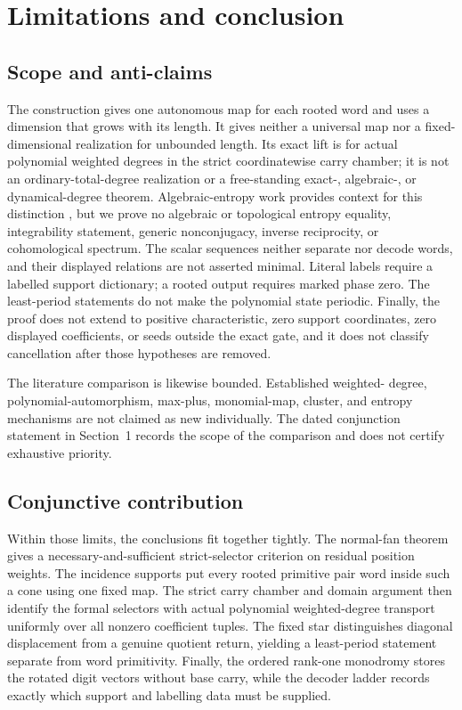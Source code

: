 \documentclass[11pt,letterpaper]{article}
\theoremstyle{definition}
\theoremstyle{remark}
\numberwithin{equation}{section}
\begin{document}
\section{Limitations and conclusion}

\subsection{Scope and anti-claims}

The construction gives one autonomous map for each rooted word and uses a
dimension that grows with its length.  It gives neither a universal map nor
a fixed-dimensional realization for unbounded length.  Its exact lift is
for actual polynomial weighted degrees in the strict coordinatewise carry
chamber; it is not an ordinary-total-degree realization or a free-standing
exact-, algebraic-, or dynamical-degree theorem.  Algebraic-entropy work
provides context for this distinction
\citep{BellonViallet1999,HoneRagniscoZullo2016}, but we prove no algebraic or
topological entropy equality, integrability statement, generic
nonconjugacy, inverse reciprocity, or cohomological spectrum.  The scalar
sequences neither separate nor decode words, and their displayed relations
are not asserted minimal.  Literal labels require a labelled support
dictionary; a rooted output requires marked phase zero.  The least-period
statements do not make the polynomial state periodic.  Finally, the proof
does not extend to positive characteristic, zero support coordinates, zero
displayed coefficients, or seeds outside the exact gate, and it does not
classify cancellation after those hypotheses are removed.

The literature comparison is likewise bounded.  Established weighted-
degree, polynomial-automorphism, max-plus, monomial-map, cluster, and entropy
mechanisms are not claimed as new individually.  The dated conjunction
statement in Section~1 records the scope of the comparison and does not
certify exhaustive priority.

\subsection{Conjunctive contribution}

Within those limits, the conclusions fit together tightly.  The normal-fan
theorem gives a necessary-and-sufficient strict-selector criterion on
residual position weights.  The incidence supports put every rooted
primitive pair word inside such a cone using one fixed map.  The strict
carry chamber and domain argument then identify the formal selectors with
actual polynomial weighted-degree transport uniformly over all nonzero
coefficient tuples.  The fixed star distinguishes diagonal displacement
from a genuine quotient return, yielding a least-period statement separate
from word primitivity.  Finally, the ordered rank-one monodromy stores the
rotated digit vectors without base carry, while the decoder ladder records
exactly which support and labelling data must be supplied.
\end{document}
